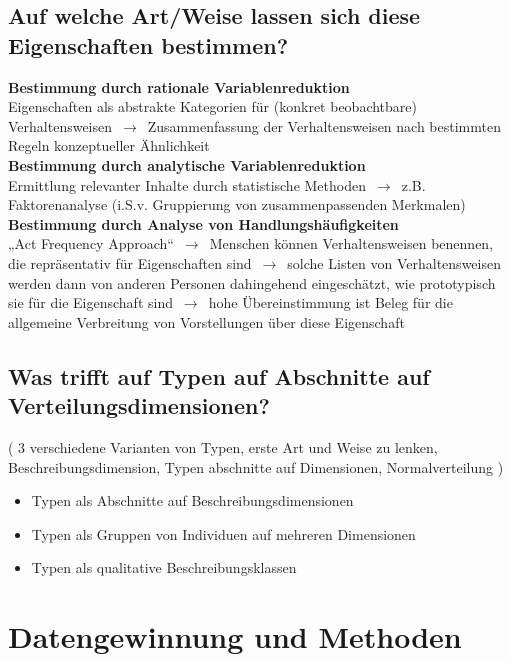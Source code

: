 \documentclass[a6paper,10pt,DIV=40]{scrartcl}
\begin{document}
\subsection{Auf welche Art/Weise lassen sich diese Eigenschaften bestimmen?}
    \textbf{Bestimmung durch rationale Variablenreduktion} \\
    Eigenschaften als abstrakte Kategorien für (konkret beobachtbare) Verhaltensweisen $\,\to\,$ Zusammenfassung der Verhaltensweisen nach bestimmten Regeln konzeptueller Ähnlichkeit\\
    \textbf{Bestimmung durch analytische Variablenreduktion} \\
    Ermittlung relevanter Inhalte durch statistische Methoden $\,\to\,$ z.B. Faktorenanalyse (i.S.v. Gruppierung von zusammenpassenden Merkmalen)\\
    \textbf{Bestimmung durch Analyse von Handlungshäufigkeiten} \\
    „Act Frequency Approach“ $\,\to\,$ Menschen können Verhaltensweisen benennen, die repräsentativ für Eigenschaften sind $\,\to\,$ solche Listen von Verhaltensweisen werden dann von anderen Personen dahingehend eingeschätzt, wie prototypisch sie für die Eigenschaft sind $\,\to\,$ hohe Übereinstimmung ist Beleg für die allgemeine Verbreitung von Vorstellungen über diese Eigenschaft
\subsection{Was trifft auf Typen auf Abschnitte auf Verteilungsdimensionen?}
    ( 3 verschiedene Varianten von Typen, erste Art und Weise zu lenken, Beschreibungsdimension, Typen abschnitte auf Dimensionen, Normalverteilung )
    \begin{itemize}\itemsep-0.5ex
        \item Typen als Abschnitte auf Beschreibungsdimensionen
        \item Typen als Gruppen von Individuen auf mehreren Dimensionen
        \item Typen als qualitative Beschreibungsklassen
    \end{itemize}

\section{Datengewinnung und Methoden}
\end{document}
